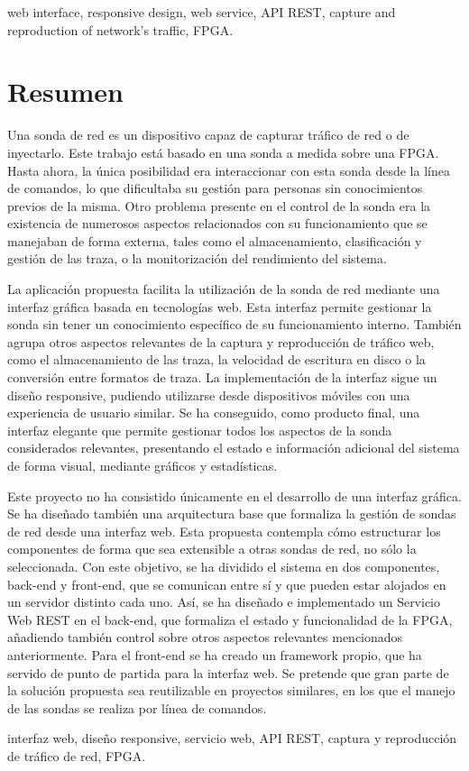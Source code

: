 \begin{keywordsEn}
web interface, responsive design, web service, API REST, capture and reproduction of network's traffic, FPGA.
\end{keywordsEn}

\chapter*{Resumen}

\begin{abstractEs}

Una sonda de red es un dispositivo capaz de capturar tráfico de red o de inyectarlo.
Este trabajo está basado en una sonda a medida sobre una FPGA.
Hasta ahora, la única posibilidad era interaccionar con esta sonda desde la línea de comandos, lo que dificultaba su gestión para personas sin conocimientos previos de la misma.
Otro problema presente en el control de la sonda era la existencia de numerosos aspectos relacionados con su funcionamiento que se manejaban de forma externa, tales como el almacenamiento, clasificación y gestión de las traza, o la monitorización del rendimiento del sistema.

La aplicación propuesta facilita la utilización de la sonda de red mediante una interfaz gráfica basada en tecnologías web.
Esta interfaz permite gestionar la sonda sin tener un conocimiento específico de su funcionamiento interno.
También agrupa otros aspectos relevantes de la captura y reproducción de tráfico web, como el almacenamiento de las traza, la velocidad de escritura en disco o la conversión entre formatos de traza.
La implementación de la interfaz sigue un diseño responsive, pudiendo utilizarse desde dispositivos móviles con una experiencia de usuario similar.
Se ha conseguido, como producto final, una interfaz elegante que permite gestionar todos los aspectos de la sonda considerados relevantes, presentando el estado e información adicional del sistema de forma visual, mediante gráficos y estadísticas.

Este proyecto no ha consistido únicamente en el desarrollo de una interfaz gráfica.
Se ha diseñado también una arquitectura base que formaliza la gestión de sondas de red desde una interfaz web.
Esta propuesta contempla cómo estructurar los componentes de forma que sea extensible a otras sondas de red, no sólo la seleccionada.
Con este objetivo, se ha dividido el sistema en dos componentes, back-end y front-end, que se comunican entre sí y que pueden estar alojados en un servidor distinto cada uno.
Así, se ha diseñado e implementado un Servicio Web REST en el back-end, que formaliza el estado y funcionalidad de la FPGA, añadiendo también control sobre otros aspectos relevantes mencionados anteriormente.
Para el front-end se ha creado un framework propio, que ha servido de punto de partida para la interfaz web.
Se pretende que gran parte de la solución propuesta sea reutilizable en proyectos similares, en los que el manejo de las sondas se realiza por línea de comandos.

\end{abstractEs}

\begin{keywordsEs}
interfaz web, diseño responsive, servicio web, API REST, captura y reproducción de tráfico de red, FPGA.
\end{keywordsEs}
